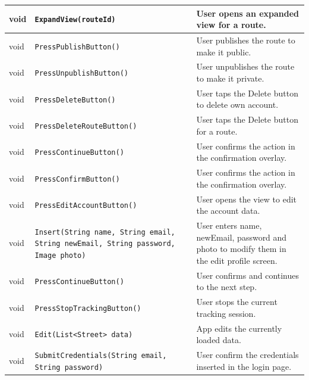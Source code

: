 \begin{table}[H]
\centering
\begin{tabularx}{\textwidth}{|L{3cm}|L{6.5cm}|Y|}
\hline
void & \texttt{ExpandView(routeId)} & User opens an expanded view for a route. \\
\hline
void & \texttt{PressPublishButton()} & User publishes the route to make it public. \\
\hline
void & \texttt{PressUnpublishButton()} & User unpublishes the route to make it private. \\
\hline
void & \texttt{PressDeleteButton()} & User taps the Delete button to delete own account. \\ \hline
void & \texttt{PressDeleteRouteButton()} & User taps the Delete button for a route. \\ \hline
void & \texttt{PressContinueButton()} & User confirms the action in the confirmation overlay. \\ \hline
void & \texttt{PressConfirmButton()} & User confirms the action in the confirmation overlay. \\ \hline
void & \texttt{PressEditAccountButton()} & User opens the view to edit the account data. \\ \hline
void & \texttt{Insert(String name, String email, String newEmail, String password, Image photo)} & User enters name, newEmail, password and photo to modify them in the edit profile screen. \\
\hline
void & \texttt{PressContinueButton()} & User confirms and continues to the next step. \\
\hline
void & \texttt{PressStopTrackingButton()} & User stops the current tracking session. \\
\hline
void & \texttt{Edit(List<Street> data)} & App edits the currently loaded data. \\
\hline
void & \texttt{SubmitCredentials(String email, String password)} & User confirm the credentials inserted in the login page. \\
\hline
\end{tabularx}
\end{table}
